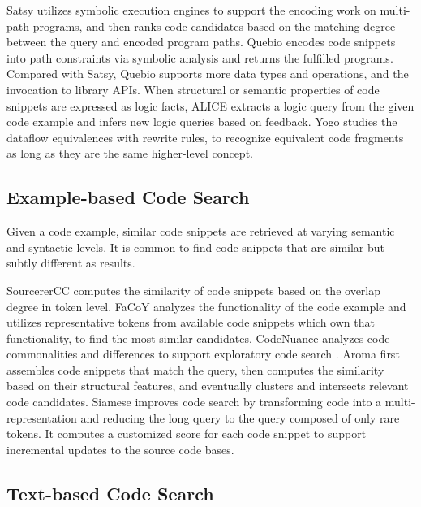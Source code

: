 \documentclass[conference]{IEEEtran}
\begin{document}
Satsy \cite{Stolee2016CodeSW} utilizes symbolic execution engines to support the encoding work on multi-path programs, and then ranks code candidates based on the matching degree between the query and encoded program paths. Quebio \cite{Chen2020EnhancingEC} encodes code snippets into path constraints via symbolic analysis and returns the fulfilled programs. Compared with Satsy, Quebio supports more data types and operations, and the invocation to library APIs. When structural or semantic properties of code snippets are expressed as logic facts, ALICE \cite{Sivaraman2019ActiveIL} extracts a logic query from the given code example and infers new logic queries based on feedback. Yogo \cite{Premtoon2020SemanticCS} studies the dataflow equivalences with rewrite rules, to recognize equivalent code fragments as long as they are the same higher-level concept.

\subsection{Example-based Code Search}

Given a code example, similar code snippets are retrieved at varying semantic and syntactic levels. It is common to find code snippets that are similar but subtly different as results.

SourcererCC \cite{Sajnani2016SourcererCCSC} computes the similarity of code snippets based on the overlap degree in token level. FaCoY \cite{Kim2018FaCoYA} analyzes the functionality of the code example and utilizes representative tokens from available code snippets which own that functionality, to find the most similar candidates. CodeNuance analyzes code commonalities and differences to support exploratory code search \cite{Liu2018SupportingEC}. Aroma \cite{Luan2018AromaCR} first assembles code snippets that match the query, then computes the similarity based on their structural features, and eventually clusters and intersects relevant code candidates. Siamese \cite{Ragkhitwetsagul2019SiameseSA} improves code search by transforming code into a multi-representation and reducing the long query to the query composed of only rare tokens. It computes a customized score for each code snippet to support incremental updates to the source code bases.

\subsection{Text-based Code Search}
\end{document}
